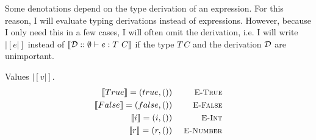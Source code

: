 \begin{defbox}
Some denotations depend on the type derivation of an expression. For this reason, I will evaluate typing derivations instead of expressions. However, because I only need this in a few cases, I will often omit the derivation, i.e. I will write $|[e|]$ instead of $|[\derivation{D} :: \emptyset |- e : T\ C|]$ if the type $T\ C$ and the derivation $\derivation{D}$ are unimportant.

Values $|[v|]$.
\begin{align*}
\axiomdef{E-True}{|[True|] = (true, ())}
\\
\axiomdef{E-False}{|[False|] = (false, ())}
\\
\axiomdef{E-Int}{|[i|] = (i, ())}
\\
\axiomdef{E-Number}{|[r|] = (r, ())}
\end{align*}


\end{defbox}
